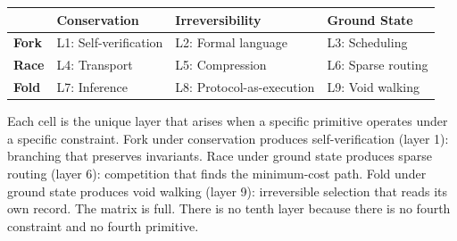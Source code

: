 \documentclass[
  11pt,
]{article}
\newcounter{none} %
\begin{document}
{\def\LTcaptype{none} %
\begin{longtable}[]{@{}
  >{\raggedright\arraybackslash}p{}
  >{\raggedright\arraybackslash}p{}
  >{\raggedright\arraybackslash}p{}
  >{\raggedright\arraybackslash}p{}@{}}
\toprule\noalign{}
\begin{minipage}[b]{\linewidth}\raggedright
\end{minipage} & \begin{minipage}[b]{\linewidth}\raggedright
Conservation
\end{minipage} & \begin{minipage}[b]{\linewidth}\raggedright
Irreversibility
\end{minipage} & \begin{minipage}[b]{\linewidth}\raggedright
Ground State
\end{minipage} \\
\midrule\noalign{}
\endhead
\bottomrule\noalign{}
\endlastfoot
\textbf{Fork} & L1: Self-verification & L2: Formal language & L3:
Scheduling \\
\textbf{Race} & L4: Transport & L5: Compression & L6: Sparse routing \\
\textbf{Fold} & L7: Inference & L8: Protocol-as-execution & L9: Void
walking \\
\end{longtable}
}

Each cell is the unique layer that arises when a specific primitive
operates under a specific constraint. Fork under conservation produces
self-verification (layer 1): branching that preserves invariants. Race
under ground state produces sparse routing (layer 6): competition that
finds the minimum-cost path. Fold under ground state produces void
walking (layer 9): irreversible selection that reads its own record. The
matrix is full. There is no tenth layer because there is no fourth
constraint and no fourth primitive.
\end{document}
